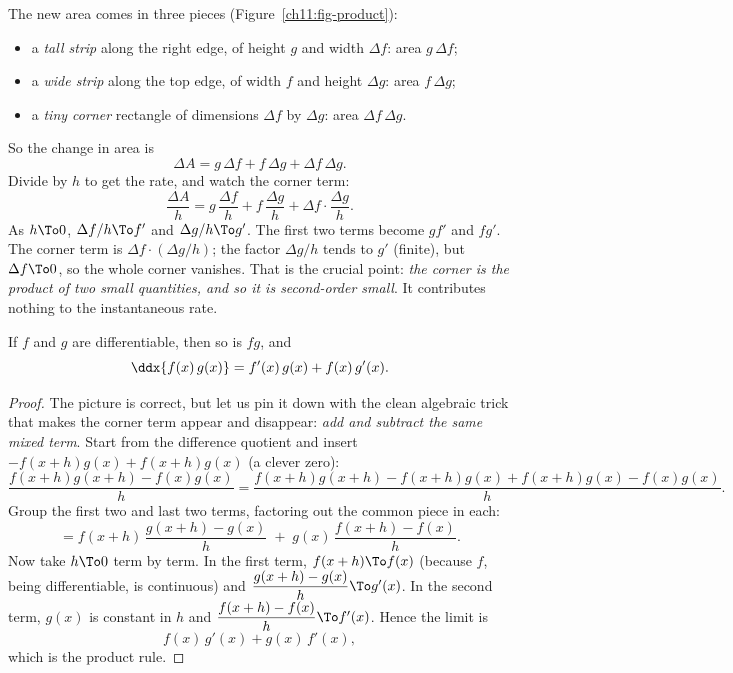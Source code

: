 The new area comes in three pieces (Figure~\ref{ch11:fig-product}):
\begin{itemize}
  \item a \emph{tall strip} along the right edge, of height $g$ and width $\Delta f$:
        area $g\,\Delta f$;
  \item a \emph{wide strip} along the top edge, of width $f$ and height $\Delta g$:
        area $f\,\Delta g$;
  \item a \emph{tiny corner} rectangle of dimensions $\Delta f$ by $\Delta g$:
        area $\Delta f\,\Delta g$.
\end{itemize}
So the change in area is
\[
  \Delta A = g\,\Delta f + f\,\Delta g + \Delta f\,\Delta g .
\]
Divide by $h$ to get the rate, and watch the corner term:
\[
  \frac{\Delta A}{h} = g\,\frac{\Delta f}{h} + f\,\frac{\Delta g}{h}
                       + \Delta f\cdot\frac{\Delta g}{h}.
\]
As $h\To 0$, $\Delta f/h \To f'$ and $\Delta g/h \To g'$. The first two terms become
$g f'$ and $f g'$. The corner term is $\Delta f\cdot(\Delta g/h)$; the factor $\Delta g/h$
tends to $g'$ (finite), but $\Delta f \To 0$, so the whole corner vanishes. That is the
crucial point: \emph{the corner is the product of two small quantities, and so it is
second-order small}. It contributes nothing to the instantaneous rate.

\begin{theorem}\label{ch11:thm-product}
If $f$ and $g$ are differentiable, then so is $fg$, and
\[
  \ddx{f(x)\,g(x)} = f'(x)\,g(x) + f(x)\,g'(x).
\]
\end{theorem}

\begin{proof}
The picture is correct, but let us pin it down with the clean algebraic trick that makes
the corner term appear and disappear: \emph{add and subtract the same mixed term}. Start
from the difference quotient and insert $-f(x+h)g(x)+f(x+h)g(x)$ (a clever zero):
\[
  \frac{f(x+h)g(x+h) - f(x)g(x)}{h}
  = \frac{f(x+h)g(x+h) - f(x+h)g(x) + f(x+h)g(x) - f(x)g(x)}{h}.
\]
Group the first two and last two terms, factoring out the common piece in each:
\[
  = f(x+h)\,\frac{g(x+h)-g(x)}{h} \;+\; g(x)\,\frac{f(x+h)-f(x)}{h}.
\]
Now take $h\To 0$ term by term. In the first term, $f(x+h)\To f(x)$ (because $f$, being
differentiable, is continuous) and $\dfrac{g(x+h)-g(x)}{h}\To g'(x)$. In the second term,
$g(x)$ is constant in $h$ and $\dfrac{f(x+h)-f(x)}{h}\To f'(x)$. Hence the limit is
\[
  f(x)\,g'(x) + g(x)\,f'(x),
\]
which is the product rule.
\end{proof}

